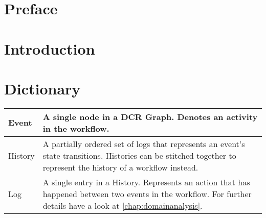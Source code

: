 \chapter{Preface}

\chapter{Introduction}

\chapter{Dictionary}
\begin{table}
	\begin{tabularx}{\linewidth}{l X}
		Event & A single node in a DCR Graph. Denotes an activity in the workflow.\\\hline
		History & A partially ordered set of logs that represents an event's state transitions. Histories can be stitched together to represent the history of a workflow instead.\\\hline
		Log & A single entry in a History. Represents an action that has happened between two events in the workflow. For further details have a look at \autoref{chap:domainanalysis}.\\
	\end{tabularx}
\end{table}